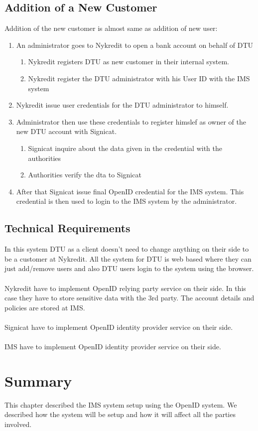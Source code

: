 \FloatBarrier
\subsection{Addition of a New Customer}
Addition of the new customer is almost same as addition of new user:
\begin{enumerate}
	\item An administrator goes to Nykredit to open a bank account on behalf of DTU 
	\begin{enumerate}
		\item Nykredit registers DTU as new customer in their internal system.
		\item Nykredit register the DTU administrator with his User ID with the IMS system
	\end{enumerate}
	\item Nykredit issue user credentials for the  DTU administrator to himself.
	\item Administrator then use these credentials to register himslef as owner of the new DTU account with Signicat. 
	\begin{enumerate}
		\item Signicat inquire about the data given in the credential with the authorities
		\item Authorities verify the dta to Signicat
	\end{enumerate}
	\item After that Signicat issue final OpenID credential for the IMS system. This credential is then used to login to the IMS system by the administrator.
\end{enumerate}
\subsection{Technical Requirements}
In this system DTU as a client doesn't need to change anything on their side to be a customer at Nykredit. All the system for DTU is web based where they can just add/remove users and also DTU users login to the system using the browser.
\\
\\Nykredit have to implement OpenID relying party service on their side. In this case they have to store sensitive data with the 3rd party. The account details and policies are stored at IMS.
\\
\\Signicat have to implement OpenID identity provider service on their side.
\\\\
IMS have to implement  OpenID identity provider service on their side.
\section{Summary}
This chapter described the IMS system setup using the OpenID system. We described how the system will be setup and how it will affect all the parties involved.

